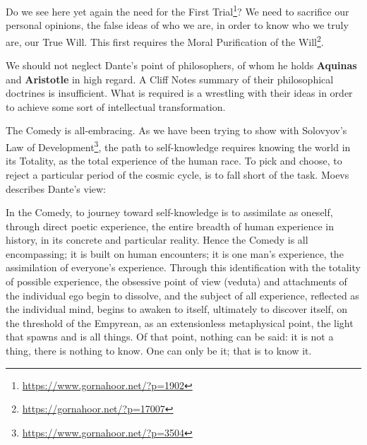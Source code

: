 Do we see here yet again the need for the First Trial\footnote{\url{https://www.gornahoor.net/?p=1902}}? We need to sacrifice our personal opinions, the false ideas of who we are, in order to know who we truly are, our True Will. This first requires the Moral Purification of the Will\footnote{\url{https://gornahoor.net/?p=17007}}.

We should not neglect Dante's point of philosophers, of whom he holds \textbf{Aquinas} and \textbf{Aristotle} in high regard. A Cliff Notes summary of their philosophical doctrines is insufficient. What is required is a wrestling with their ideas in order to achieve some sort of intellectual transformation.

The Comedy is all-embracing. As we have been trying to show with Solovyov's Law of Development\footnote{\url{https://www.gornahoor.net/?p=3504}}, the path to self-knowledge requires knowing the world in its Totality, as the total experience of the human race. To pick and choose, to reject a particular period of the cosmic cycle, is to fall short of the task. Moevs describes Dante's view:

\begin{quotex}
In the Comedy, to journey toward self-knowledge is to assimilate as oneself, through direct poetic experience, the entire breadth of human experience in history, in its concrete and particular reality. Hence the Comedy is all encompassing; it is built on human encounters; it is one man's experience, the assimilation of everyone's experience. Through this identification with the totality of possible experience, the obsessive point of view (veduta) and attachments of the individual ego begin to dissolve, and the subject of all experience, reflected as the individual mind, begins to awaken to itself, ultimately to discover itself, on the threshold of the Empyrean, as an extensionless metaphysical point, the light that spawns and is all things. Of that point, nothing can be said: it is not a thing, there is nothing to know. One can only be it; that is to know it.
\end{quotex}




